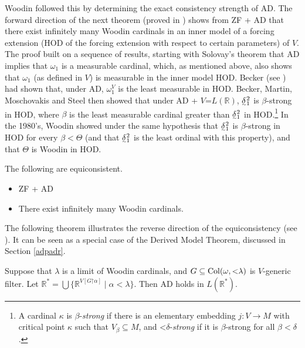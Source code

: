 \documentclass{book}%
\def\undertilde#1{{\baselineskip=0pt\vtop
  {\hbox{$#1$}\hbox{$\scriptscriptstyle\sim$}}}{}}
\newcommand{\restrict}{\mathord{\upharpoonright}}
\newcommand{\less}{\mathord{<}}
\begin{document}
Woodin followed this by determining the exact consistency strength of AD.
The forward direction of the next theorem (proved in \cite{KoellnerWoodin:handbook}) shows from ZF + {\rm AD} that there
exist infinitely many Woodin cardinals in an inner model of a
forcing extension (HOD of the forcing extension with respect to
certain parameters) of $V$. The proof built on a sequence of results, starting with Solovay's theorem that AD implies that $\omega_{1}$ is a measurable cardinal, which, as mentioned above, also shows that $\omega_{1}$
(as defined in $V$) is measurable in the inner model HOD.
Becker (see \cite{BeckerMoschovakis:1981}) had shown that, under AD,
$\omega_{1}^{V}$ is the least measurable in HOD.
Becker, Martin, Moschovakis and Steel then showed that under AD + $V\mathord{=}L(\mathbb{R})$, $\undertilde{\delta}^{2}_{1}$ is $\beta$-strong in
HOD, where $\beta$ is the least measurable cardinal greater than
$\undertilde{\delta}^{2}_{1}$ in HOD.\footnote{A cardinal
$\kappa$ is $\beta$-\emph{strong} if there is an elementary
embedding $j \colon V \to M$ with critical point $\kappa$ such that $V_{\beta} \subseteq M$, and
$\less\delta$-\emph{strong} if it is $\beta$-strong for all $\beta < \delta$.}
In the 1980's, Woodin showed under the same
hypothesis that $\undertilde{\delta}^{2}_{1}$ is $\beta$-strong in
HOD for every $\beta < \Theta$ (and that
$\undertilde{\delta}^{2}_{1}$ is the least ordinal with this
property), and that $\Theta$ is Woodin in HOD.

\begin{theorem} The following are equiconsistent.
\begin{itemize}
\item {\rm ZF + AD}
\item There exist infinitely many Woodin cardinals.
\end{itemize}
\end{theorem}

The following theorem illustrates the reverse direction of the equiconsistency (see \cite{Steel:dmt}).
It can be seen as a special case of the Derived Model Theorem, discussed in Section \ref{adpadr}.


\begin{theorem} Suppose that $\lambda$ is a limit of Woodin
cardinals, and $G \subseteq {\rm Col}(\omega, \less\lambda)$ is  $V$-generic
filter. Let $\mathbb{R}^{*} = \bigcup \{ \mathbb{R}^{V[G \restrict
\alpha]} \mid \alpha < \lambda \}$. Then {\rm AD} holds in
$L(\mathbb{R}^{*})$.
\end{theorem}
\end{document}
